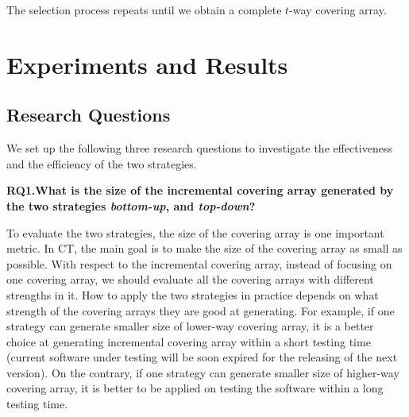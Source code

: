 \documentclass[conference]{IEEEtran}
\theoremstyle{definition}
\begin{document}
The selection process repeats until we obtain a complete $t$-way covering array.




\section{Experiments and Results}
\subsection{Research Questions}
We set up the following three research questions to investigate the effectiveness and the efficiency of the two strategies.

\textbf{RQ1.What is the size of the incremental covering array generated by the two strategies \emph{bottom-up}, and \emph{top-down}?}

To evaluate the two strategies, the size of the covering array is one important metric. In CT, the main goal is to make the size of the covering array as small as possible. With respect to the incremental covering array, instead of focusing on one covering array, we should evaluate all the covering arrays with different strengths in it. How to apply the two strategies in practice depends on what strength of the covering arrays they are good at generating. For example, if one strategy can generate smaller size of lower-way covering array, it is a better choice at generating incremental covering array within a short testing time (current software under testing will be soon expired for the releasing of the next version). On the contrary, if one strategy can generate smaller size of higher-way covering array, it is better to be applied on testing the software within a long testing time.
\end{document}
